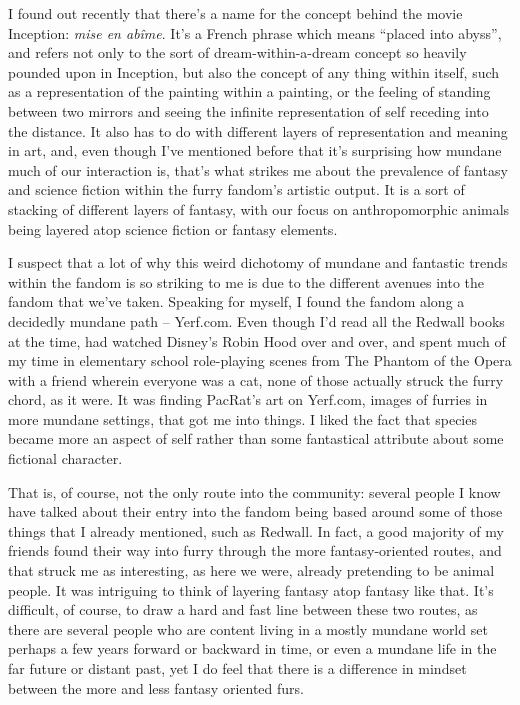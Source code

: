 
I found out recently that there's a name for the concept behind the movie Inception: \textit{mise en ab\^{i}me}.  It's a French phrase which means ``placed into abyss'', and refers not only to the sort of dream-within-a-dream concept so heavily pounded upon in Inception, but also the concept of any thing within itself, such as a representation of the painting within a painting, or the feeling of standing between two mirrors and seeing the infinite representation of self receding into the distance.  It also has to do with different layers of representation and meaning in art, and, even though I've mentioned before that it's surprising how mundane much of our interaction is, that's what strikes me about the prevalence of fantasy and science fiction within the furry fandom's artistic output.  It is a sort of stacking of different layers of fantasy, with our focus on anthropomorphic animals being layered atop science fiction or fantasy elements.

I suspect that a lot of why this weird dichotomy of mundane and fantastic trends within the fandom is so striking to me is due to the different avenues into the fandom that we've taken.  Speaking for myself, I found the fandom along a decidedly mundane path -- Yerf.com.  Even though I'd read all the Redwall books at the time, had watched Disney's Robin Hood over and over, and spent much of my time in elementary school role-playing scenes from The Phantom of the Opera with a friend wherein everyone was a cat, none of those actually struck the furry chord, as it were.  It was finding PacRat's art on Yerf.com, images of furries in more mundane settings, that got me into things.  I liked the fact that species became more an aspect of self rather than some fantastical attribute about some fictional character.

That is, of course, not the only route into the community: several people I know have talked about their entry into the fandom being based around some of those things that I already mentioned, such as Redwall.  In fact, a good majority of my friends found their way into furry through the more fantasy-oriented routes, and that struck me as interesting, as here we were, already pretending to be animal people.  It was intriguing to think of layering fantasy atop fantasy like that.  It's difficult, of course, to draw a hard and fast line between these two routes, as there are several people who are content living in a mostly mundane world set perhaps a few years forward or backward in time, or even a mundane life in the far future or distant past, yet I do feel that there is a difference in mindset between the more and less fantasy oriented furs.


